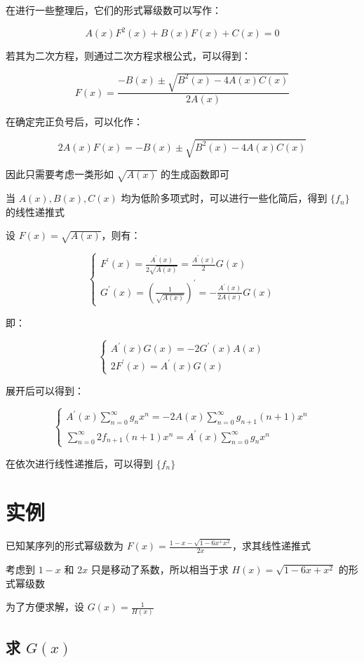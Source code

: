 \documentclass[UTF8]{article}
\begin{document}
在进行一些整理后，它们的形式幂级数可以写作：

$$
A(x)F^2(x)+B(x)F(x)+C(x)=0
$$

若其为二次方程，则通过二次方程求根公式，可以得到：

$$
F(x)=\frac{-B(x) \pm \sqrt{B^2(x)-4A(x)C(x)}}{2A(x)}
$$

在确定完正负号后，可以化作：

$$
2A(x)F(x)=-B(x) \pm \sqrt{B^2(x)-4A(x)C(x)}
$$

因此只需要考虑一类形如 $\sqrt{A(x)}$ 的生成函数即可

当 $A(x),B(x),C(x)$ 均为低阶多项式时，可以进行一些化简后，得到 $\{f_n\}$ 的线性递推式

设 $F(x)=\sqrt{A(x)}$，则有：

$$
\begin{cases}
    F ^\prime (x)=\frac{A ^\prime (x)}{2\sqrt{A(x)}}=\frac{A ^\prime (x)}{2} G(x) \\
    G ^\prime (x)=\left(\frac{1}{\sqrt{A(x)}}\right) ^\prime =-\frac{A ^\prime (x)}{2A(x)}G(x)
\end{cases}
$$

即：

$$
\begin{cases}
    A ^\prime (x)G(x)=-2G ^\prime (x)A(x) \\
    2F ^\prime (x)=A ^\prime (x)G(x)
\end{cases}
$$

展开后可以得到：

$$
\begin{cases}
    A ^\prime (x)\sum_{n=0}^{\infty}g_nx^n=-2A(x)\sum_{n=0}^{\infty}g_{n+1}(n+1)x^n \\
    \sum_{n=0}^{\infty}2f_{n+1}(n+1)x^n=A ^\prime (x)\sum_{n=0}^{\infty}g_nx^n
\end{cases}
$$

在依次进行线性递推后，可以得到 $\{f_n\}$

\section{实例}

已知某序列的形式幂级数为 $F(x)=\frac{1-x-\sqrt{1-6x^+x^2}}{2x}$，求其线性递推式

考虑到 $1-x$ 和 $2x$ 只是移动了系数，所以相当于求 $H(x)=\sqrt{1-6x+x^2}$ 的形式幂级数

为了方便求解，设 $G(x)=\frac{1}{H(x)}$

\subsection{求 $G(x)$}
\end{document}
